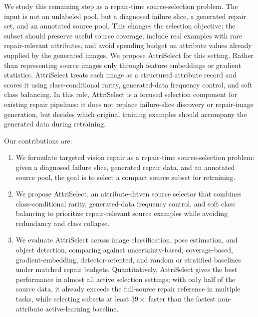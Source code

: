 \documentclass{article}
\newcommand{\model}{AttriSelect\xspace}
\begin{document}
We study this remaining step as a repair-time source-selection problem. The input is not an unlabeled pool, but a diagnosed failure slice, a generated repair set, and an annotated source pool. This changes the selection objective: the subset should preserve useful source coverage, include real examples with rare repair-relevant attributes, and avoid spending budget on attribute values already supplied by the generated images. We propose \model for this setting. Rather than representing source images only through feature embeddings or gradient statistics, \model treats each image as a structured attribute record and scores it using class-conditional rarity, generated-data frequency control, and soft class balancing. In this role, \model is a focused selection component for existing repair pipelines: it does not replace failure-slice discovery or repair-image generation, but decides which original training examples should accompany the generated data during retraining.

Our contributions are:
\begin{enumerate}
\item We formulate targeted vision repair as a repair-time source-selection problem: given a diagnosed failure slice, generated repair data, and an annotated source pool, the goal is to select a compact source subset for retraining.

\item We propose \model, an attribute-driven source selector that combines class-conditional rarity, generated-data frequency control, and soft class balancing to prioritize repair-relevant source examples while avoiding redundancy and class collapse.


\item We evaluate \model across image classification, pose estimation, and object detection, comparing against uncertainty-based, coverage-based, gradient-embedding, detector-oriented, and random or stratified baselines under matched repair budgets. Quantitatively, \model gives the best performance in almost all active selection settings; with only half of the source data, it already exceeds the full-source repair reference in multiple tasks, while selecting subsets at least $39\times$ faster than the fastest non-attribute active-learning baseline.

\end{enumerate}
\end{document}
